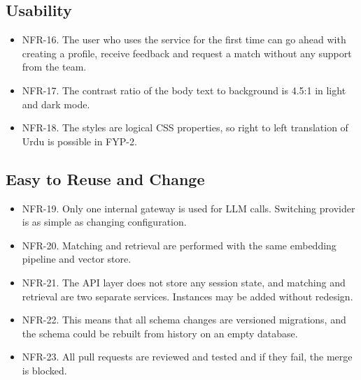 \documentclass{FastFyp}
\begin{document}
\subsection{Usability}
\begin{itemize}
 \item NFR-16. The user who uses the service for the first time can go ahead with creating a profile, receive feedback and request a match without any support from the team.
 \item NFR-17. The contrast ratio of the body text to background is 4.5:1 in light and dark mode.
 \item NFR-18. The styles are logical CSS properties, so right to left translation of Urdu is possible in FYP-2.
\end{itemize}

\subsection{Easy to Reuse and Change}
\begin{itemize}
 \item NFR-19. Only one internal gateway is used for LLM calls. Switching provider is as simple as changing configuration.
 \item NFR-20. Matching and retrieval are performed with the same embedding pipeline and vector store.
 \item NFR-21. The API layer does not store any session state, and matching and retrieval are two separate services. Instances may be added without redesign.
 \item NFR-22. This means that all schema changes are versioned migrations, and the schema could be rebuilt from history on an empty database.
 \item NFR-23. All pull requests are reviewed and tested and if they fail, the merge is blocked.
\end{itemize}
\end{document}

